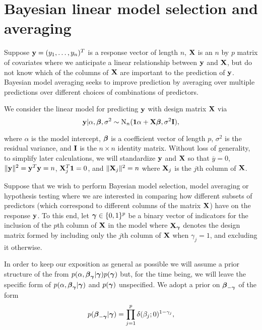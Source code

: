 \section{Bayesian linear model selection and averaging}
\label{sec:bma}



Suppose ${\bf y} = (y_1,\ldots,y_n)^T$ is a response vector of length $n$, ${\bf X}$ is an $n$ by $p$ matrix 
of covariates where we anticipate a linear relationship between ${\bf y}$ and ${\bf X}$, but do not know
which of the columns of ${\bf X}$ are important to the prediction of ${\bf y}$.
Bayesian model averaging seeks to improve prediction by averaging over multiple
predictions over different choices of combinations of predictors.

We consider the linear model for predicting ${\bf y}$ with design matrix ${\bf X}$ via
\begin{equation}
	\label{eq:linearModel}
	{\bf y} | \alpha, {\boldsymbol \beta}, \sigma^2 \sim \text{N}_n({\bf 1}\alpha + {\bf X} {\boldsymbol \beta}, \sigma^2 {\bf I}),
\end{equation} 


\noindent where $\alpha$ is the model intercept, ${\boldsymbol \beta}$ is a coefficient vector of length $p$, 
$\sigma^2$ is the residual variance, and ${\bf I}$ is the $n \times n$ identity matrix. 
Without loss of generality, to simplify later calculations, we will standardize ${\bf y}$ and ${\bf X}$ 
so that $\overline{y} = 0$, 
$\|{\bf y}\|^2 = {\bf y}^T{\bf y} = n$, ${\bf X}_j^T{\bf 1} = 0$,  and $\|{\bf X}_j\|^2 = n$ where ${\bf X}_j$ is the $j$th 
column of ${\bf X}$. 


Suppose that we wish to perform Bayesian model selection, model averaging or hypothesis 
testing where we are interested in comparing how different subsets of predictors 
(which correspond to different columns of the matrix ${\bf X}$) have on the response ${\bf y}$. To this end, 
let ${\boldsymbol \gamma} \in \{0, 1\}^p$ be a binary vector of indicators for the inclusion of the $p$th column 
of ${\bf X}$ in the model where ${\bf X}_{\boldsymbol \gamma}$ denotes the design matrix formed by including only the 
$j$th column of ${\bf X}$ when $\gamma_j = 1$, and excluding it otherwise. 

In order to keep our exposition as general as possible we will assume a prior structure of
the from 
$p(\alpha,{\boldsymbol \beta}_{{\boldsymbol \gamma}}|{\boldsymbol \gamma})p({\boldsymbol \gamma})$ but,
for
the time being, we will leave the specific form of $p(\alpha,{\boldsymbol \beta}_{{\boldsymbol \gamma}}|{\boldsymbol \gamma})$ and $p({\boldsymbol \gamma})$ unspecified. 
We adopt a prior on ${\boldsymbol \beta}_{-{\boldsymbol \gamma}}$  
of the form
\begin{equation}
	\label{eq:spikeAndSlab}
	\displaystyle p({\boldsymbol \beta}_{-{\boldsymbol \gamma}}|{\boldsymbol \gamma}) = \prod_{j=1}^p \delta(\beta_j;0)^{1-\gamma_j},
\end{equation} 

